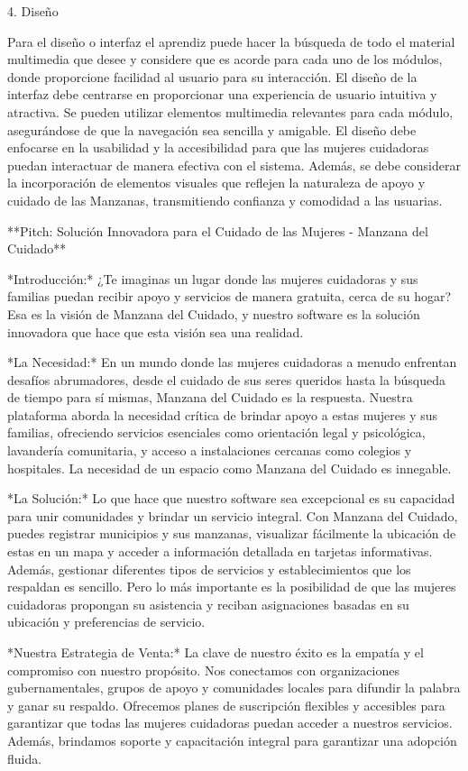  
4.    Diseño
 
Para el diseño o interfaz el aprendiz puede hacer la búsqueda de todo el material multimedia que desee y considere que es acorde para cada uno de los módulos, donde proporcione facilidad al usuario para su interacción.
El diseño de la interfaz debe centrarse en proporcionar una experiencia de usuario intuitiva y atractiva. Se pueden utilizar elementos multimedia relevantes para cada módulo, asegurándose de que la navegación sea sencilla y amigable. El diseño debe enfocarse en la usabilidad y la accesibilidad para que las mujeres cuidadoras puedan interactuar de manera efectiva con el sistema.
Además, se debe considerar la incorporación de elementos visuales que reflejen la naturaleza de apoyo y cuidado de las Manzanas, transmitiendo confianza y comodidad a las usuarias.


**Pitch: Solución Innovadora para el Cuidado de las Mujeres - Manzana del Cuidado**

*Introducción:*
¿Te imaginas un lugar donde las mujeres cuidadoras y sus familias puedan recibir apoyo y servicios de manera gratuita, cerca de su hogar? Esa es la visión de Manzana del Cuidado, y nuestro software es la solución innovadora que hace que esta visión sea una realidad.

*La Necesidad:*
En un mundo donde las mujeres cuidadoras a menudo enfrentan desafíos abrumadores, desde el cuidado de sus seres queridos hasta la búsqueda de tiempo para sí mismas, Manzana del Cuidado es la respuesta. Nuestra plataforma aborda la necesidad crítica de brindar apoyo a estas mujeres y sus familias, ofreciendo servicios esenciales como orientación legal y psicológica, lavandería comunitaria, y acceso a instalaciones cercanas como colegios y hospitales. La necesidad de un espacio como Manzana del Cuidado es innegable.

*La Solución:*
Lo que hace que nuestro software sea excepcional es su capacidad para unir comunidades y brindar un servicio integral. Con Manzana del Cuidado, puedes registrar municipios y sus manzanas, visualizar fácilmente la ubicación de estas en un mapa y acceder a información detallada en tarjetas informativas. Además, gestionar diferentes tipos de servicios y establecimientos que los respaldan es sencillo. Pero lo más importante es la posibilidad de que las mujeres cuidadoras propongan su asistencia y reciban asignaciones basadas en su ubicación y preferencias de servicio.

*Nuestra Estrategia de Venta:*
La clave de nuestro éxito es la empatía y el compromiso con nuestro propósito. Nos conectamos con organizaciones gubernamentales, grupos de apoyo y comunidades locales para difundir la palabra y ganar su respaldo. Ofrecemos planes de suscripción flexibles y accesibles para garantizar que todas las mujeres cuidadoras puedan acceder a nuestros servicios. Además, brindamos soporte y capacitación integral para garantizar una adopción fluida.


